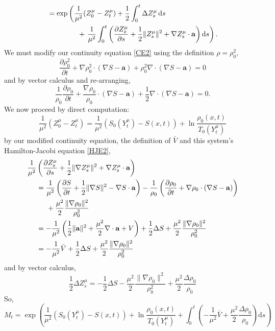 \documentclass[a4paper,12pt,draft]{report}
\begin{document}
{\begin{align}
& = \exp\left(\frac{1}{\mu^2}(Z_0^\mu - Z_t^\mu) + \frac{1}{2}\int_0^t\Delta Z_s^\mu\,\mathrm{d}s\right.\nonumber\\
& \hspace{1.5cm} + \left.\frac{1}{\mu^2}\int_0^t\left(\frac{\partial Z_s^\mu}{\partial s} + \frac{1}{2}\|Z_s^\mu\|^2 + \nabla Z_s^\mu\cdot\mathbf{a}\right)\mathrm{d}s\right).\nonumber
\end{align}
We must modify our continuity equation \eqref{CE2} using the definition $\rho = \rho_0^2$,
$$
\frac{\partial\rho_0^2}{\partial t} + \nabla\rho_0^2\cdot(\nabla S - \mathbf{a}) + \rho_0^2\nabla\cdot(\nabla S - \mathbf{a}) = 0
$$
and by vector calculus and re-arranging,
$$
\frac{1}{\rho_0}\frac{\partial\rho_0}{\partial t} + \frac{\nabla\rho_0}{\rho_0}\cdot(\nabla S - \mathbf{a}) + \frac{1}{2}\nabla\cdot(\nabla S - \mathbf{a}) = 0.
$$
We now proceed by direct computation:
$$
\frac{1}{\mu^2}(Z_0^\mu - Z_t^\mu) = \frac{1}{\mu^2}(S_0(Y_t^\mu) - S(x, t)) + \ln\frac{\rho_0(x, t)}{T_0(Y_t^\mu)}
$$
by our modified continuity equation, the definition of $\bar{V}$ and this system's Hamilton-Jacobi equation \eqref{HJE2},
\begin{align}
\frac{1}{\mu^2}&\left(\frac{\partial Z_s^\mu}{\partial s} + \frac{1}{2}\|\nabla Z_s^\mu\|^2 + \nabla Z_s^\mu\cdot\mathbf{a}\right)\nonumber\\
& = \frac{1}{\mu^2}\left(\frac{\partial S}{\partial t} + \frac{1}{2}\|\nabla S\|^2 - \nabla S\cdot\mathbf{a}\right) - \frac{1}{\rho_0}\left(\frac{\partial\rho_0}{\partial t} + \nabla\rho_0\cdot(\nabla S - \mathbf{a})\right)\nonumber\\
& \hspace{0.5cm} + \frac{\mu^2}{2}\frac{\|\nabla\rho_0\|^2}{\rho_0^2}\nonumber\\
& = -\frac{1}{\mu^2}\left(\frac{1}{2}\|\mathbf{a}\|^2 + \frac{\mu^2}{2}\nabla\cdot\mathbf{a} + V\right) + \frac{1}{2}\Delta S + \frac{\mu^2}{2}\frac{\|\nabla\rho_0\|^2}{\rho_0^2}\nonumber\\
& = -\frac{1}{\mu^2}\bar{V} + \frac{1}{2}\Delta S + \frac{\mu^2}{2}\frac{\|\nabla\rho_0\|^2}{\rho_0^2}\nonumber
\end{align}
and by vector calculus,
$$
\frac{1}{2}\Delta Z_s^\mu = -\frac{1}{2}\Delta S - \frac{\mu^2}{2}\frac{\|\nabla\rho_0\|^2}{\rho_0^2} + \frac{\mu^2}{2}\frac{\Delta\rho_0}{\rho_0}
$$
So,
$$
M_t = \exp\left(\frac{1}{\mu^2}(S_0(Y_t^\mu) - S(x, t)) + \ln\frac{\rho_0(x, t)}{T_0(Y_t^\mu)} + \int_0^t\left(-\frac{1}{\mu^2}\bar{V} + \frac{\mu^2}{2}\frac{\Delta\rho_0}{\rho_0}\right)\mathrm{d}s\right)\nonumber
$$}
\end{document}

